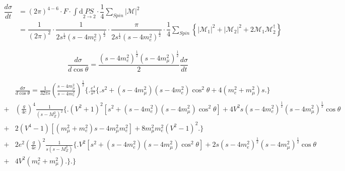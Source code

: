 \documentclass[11pt]{article}
\begin{document}

    \begin{equation}
	\begin{split}
	\dfrac{d\sigma}{dt} & = \left(2\pi\right)^{4-6}\cdot F \cdot \int \mathrm{d}\underset{2\to2}{PS} \cdot \dfrac{1}{4}\sum_{Spin}\lvert\mathcal{M}\rvert^2 \\ 
	 & = \dfrac{1}{\left(2\pi\right)^{2}} \cdot \dfrac{1}{2s^{\frac{1}{2}}(s-4m_e^2)^{\frac{1}{2}} } \cdot \dfrac{\pi}{2s^{\frac{1}{2}}(s-4m_e^2)^{\frac{1}{2}} } \cdot \dfrac{1}{4}\sum_{Spin}\left\{\lvert\mathcal{M}_1\rvert^2+\lvert\mathcal{M}_2\rvert^2+2\mathcal{M}_1\mathcal{M}_2^{\dagger}\right\}
	\end{split}
	\end{equation}

    \begin{equation}
    \frac{d\sigma}{d\cos\theta}=\frac{(s-4m_e^2)^{\frac{1}{2}}(s-4m_\mu^2)^{\frac{1}{2}}}{2}\frac{d\sigma}{dt}
    \end{equation}

    \begin{equation}
    \begin{split}
    &\frac{d\sigma}{d\cos\theta}=\frac{1}{32\pi s}\left(\frac{s-4m_\mu^2}{s-4m_e^2}\right)^{\frac{1}{2}} \Bigg\{ \Bigg. \frac{e^4}{s^2}\Big\{ \Big. s^2+(s-4m_\mu^2)(s-4m_e^2)\cos^2\theta+4(m_e^2+m_\mu^2)s\Big. \Big\} \\
    +&\left(\frac{g}{4c}\right)^4\frac{1}{(s-M_Z^2)^2}\Big\{ \Big. (V^2+1)^2\left[s^2+(s-4m_e^2)(s-4m_\mu^2)\cos^2\theta\right]+4V^2s(s-4m_e^2)^{\frac{1}{2}}(s-4m_\mu^2)^{\frac{1}{2}}\cos\theta\\
    +&2(V^4-1)\left[(m_\mu^2+m_e^2)s-4m_\mu^2 m_e^2\right]+8m_\mu^2 m_e^2(V^2-1)^2 \Big. \Big\}\\
    +&2e^2\left(\frac{g}{4c}\right)^2\frac{1}{s(s-M_Z^2)}\Big\{ \Big. V^2\left[ s^2+(s-4m_e^2)(s-4m_\mu^2)\cos^2\theta \right]+2s(s-4m_e^2)^{\frac{1}{2}}(s-4m_\mu^2)^{\frac{1}{2}}\cos\theta\\
    +&4V^2(m_e^2+m_\mu^2) \Big. \Big\}
    \Bigg. \Bigg\}
    \end{split}
    \end{equation}


\end{document}
